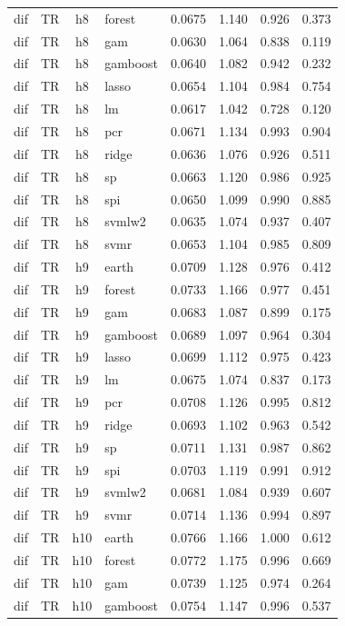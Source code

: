 \begin{ThreePartTable}
\begin{longtable}[t]{llclcccc}
dif & TR & h8 & forest & 0.0675 & 1.140 & 0.926 & 0.373\\
dif & TR & h8 & gam & 0.0630 & 1.064 & 0.838 & 0.119\\
dif & TR & h8 & gamboost & 0.0640 & 1.082 & 0.942 & 0.232\\
dif & TR & h8 & lasso & 0.0654 & 1.104 & 0.984 & 0.754\\
dif & TR & h8 & lm & 0.0617 & 1.042 & 0.728 & 0.120\\
dif & TR & h8 & pcr & 0.0671 & 1.134 & 0.993 & 0.904\\
dif & TR & h8 & ridge & 0.0636 & 1.076 & 0.926 & 0.511\\
dif & TR & h8 & sp & 0.0663 & 1.120 & 0.986 & 0.925\\
dif & TR & h8 & spi & 0.0650 & 1.099 & 0.990 & 0.885\\
dif & TR & h8 & svmlw2 & 0.0635 & 1.074 & 0.937 & 0.407\\
dif & TR & h8 & svmr & 0.0653 & 1.104 & 0.985 & 0.809\\
\addlinespace
dif & TR & h9 & earth & 0.0709 & 1.128 & 0.976 & 0.412\\
dif & TR & h9 & forest & 0.0733 & 1.166 & 0.977 & 0.451\\
dif & TR & h9 & gam & 0.0683 & 1.087 & 0.899 & 0.175\\
dif & TR & h9 & gamboost & 0.0689 & 1.097 & 0.964 & 0.304\\
dif & TR & h9 & lasso & 0.0699 & 1.112 & 0.975 & 0.423\\
dif & TR & h9 & lm & 0.0675 & 1.074 & 0.837 & 0.173\\
dif & TR & h9 & pcr & 0.0708 & 1.126 & 0.995 & 0.812\\
dif & TR & h9 & ridge & 0.0693 & 1.102 & 0.963 & 0.542\\
dif & TR & h9 & sp & 0.0711 & 1.131 & 0.987 & 0.862\\
dif & TR & h9 & spi & 0.0703 & 1.119 & 0.991 & 0.912\\
dif & TR & h9 & svmlw2 & 0.0681 & 1.084 & 0.939 & 0.607\\
dif & TR & h9 & svmr & 0.0714 & 1.136 & 0.994 & 0.897\\
\addlinespace
dif & TR & h10 & earth & 0.0766 & 1.166 & 1.000 & 0.612\\
dif & TR & h10 & forest & 0.0772 & 1.175 & 0.996 & 0.669\\
dif & TR & h10 & gam & 0.0739 & 1.125 & 0.974 & 0.264\\
dif & TR & h10 & gamboost & 0.0754 & 1.147 & 0.996 & 0.537\\

\end{longtable}
\end{ThreePartTable}

